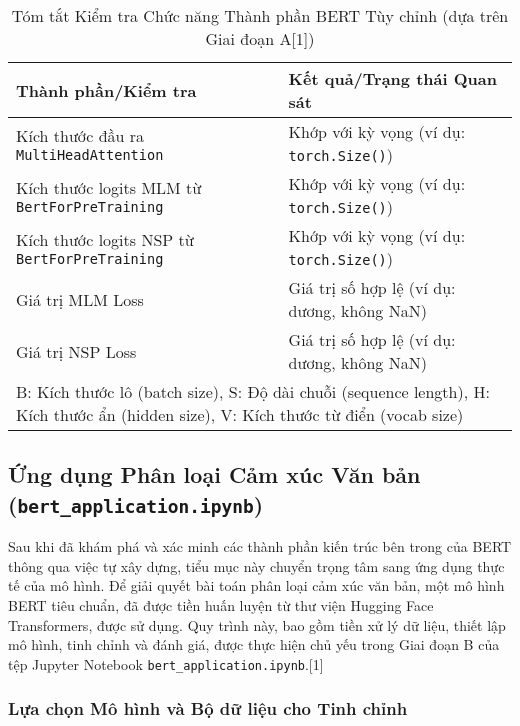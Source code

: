 \begin{table}[H]
\centering
\caption{Tóm tắt Kiểm tra Chức năng Thành phần BERT Tùy chỉnh (dựa trên Giai đoạn A[1])}
\label{tab:component_verification_summary_rewrite}
\begin{tabular}{ll}
\toprule
\textbf{Thành phần/Kiểm tra} & \textbf{Kết quả/Trạng thái Quan sát} \\
\midrule
Kích thước đầu ra \texttt{MultiHeadAttention} & Khớp với kỳ vọng (ví dụ: \texttt{torch.Size()}) \\
Kích thước logits MLM từ \texttt{BertForPreTraining} & Khớp với kỳ vọng (ví dụ: \texttt{torch.Size()}) \\
Kích thước logits NSP từ \texttt{BertForPreTraining} & Khớp với kỳ vọng (ví dụ: \texttt{torch.Size()}) \\
Giá trị MLM Loss & Giá trị số hợp lệ (ví dụ: dương, không NaN) \\
Giá trị NSP Loss & Giá trị số hợp lệ (ví dụ: dương, không NaN) \\
\bottomrule
\multicolumn{2}{l}{\footnotesize{B: Kích thước lô (batch size), S: Độ dài chuỗi (sequence length), H: Kích thước ẩn (hidden size), V: Kích thước từ điển (vocab size)}}
\end{tabular}
\end{table}

\subsection{Ứng dụng Phân loại Cảm xúc Văn bản (\texttt{bert\_application.ipynb})}
\label{ssec:ung_dung_phan_loai_cam_xuc_rewrite}
Sau khi đã khám phá và xác minh các thành phần kiến trúc bên trong của BERT thông qua việc tự xây dựng, tiểu mục này chuyển trọng tâm sang ứng dụng thực tế của mô hình. Để giải quyết bài toán phân loại cảm xúc văn bản, một mô hình BERT tiêu chuẩn, đã được tiền huấn luyện từ thư viện Hugging Face Transformers, được sử dụng. Quy trình này, bao gồm tiền xử lý dữ liệu, thiết lập mô hình, tinh chỉnh và đánh giá, được thực hiện chủ yếu trong Giai đoạn B của tệp Jupyter Notebook \texttt{bert\_application.ipynb}.[1]

\subsubsection{Lựa chọn Mô hình và Bộ dữ liệu cho Tinh chỉnh}
\label{sssec:lua_chon_mo_hinh_du_lieu_finetuning_rewrite}


